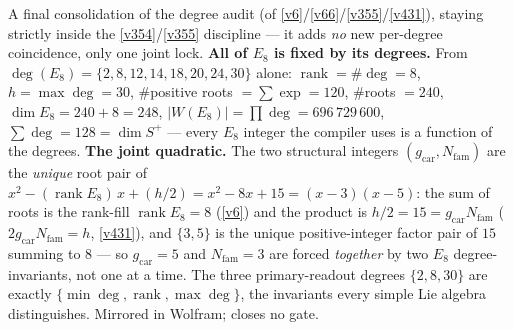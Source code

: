 \documentclass[11pt,a4paper]{article}
\newcommand{\Nfam}{N_{\mathrm{fam}}}
\newcommand{\gcar}{g_{\mathrm{car}}}
\begin{document}
\begin{winbox}
A final consolidation of the degree audit (of \vref{v6}/\vref{v66}/\vref{v355}/\vref{v431}), staying strictly inside the \vref{v354}/\vref{v355} discipline --- it adds \emph{no} new per-degree coincidence, only one joint lock. \textbf{All of $E_8$ is fixed by its degrees.} From $\deg(E_8)=\{2,8,12,14,18,20,24,30\}$ alone: $\operatorname{rank}=\#\deg=8$, $h=\max\deg=30$, $\#$positive roots $=\sum\exp=120$, $\#$roots $=240$, $\dim E_8=240+8=248$, $|W(E_8)|=\prod\deg=696\,729\,600$, $\sum\deg=128=\dim S^+$ --- every $E_8$ integer the compiler uses is a function of the degrees. \textbf{The joint quadratic.} The two structural integers $(\gcar,\Nfam)$ are the \emph{unique} root pair of $x^2-(\operatorname{rank}E_8)\,x+(h/2)=x^2-8x+15=(x-3)(x-5)$: the sum of roots is the rank-fill $\operatorname{rank}E_8=8$ (\vref{v6}) and the product is $h/2=15=\gcar\Nfam$ ($2\gcar\Nfam=h$, \vref{v431}), and $\{3,5\}$ is the unique positive-integer factor pair of $15$ summing to $8$ --- so $\gcar=5$ and $\Nfam=3$ are forced \emph{together} by two $E_8$ degree-invariants, not one at a time. The three primary-readout degrees $\{2,8,30\}$ are exactly $\{\min\deg,\operatorname{rank},\max\deg\}$, the invariants every simple Lie algebra distinguishes. Mirrored in Wolfram; closes no gate.
\end{winbox}
\end{document}
